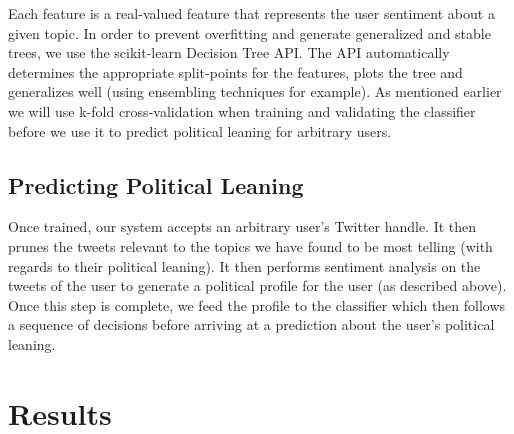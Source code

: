 \documentclass[letterpaper]{article} %
\begin{document}
Each feature is a real-valued feature that represents the user sentiment about a given topic. In order to prevent overfitting and generate generalized and stable trees, we use the scikit-learn Decision Tree API. The API automatically determines the appropriate split-points for the features, plots the tree and generalizes well (using ensembling techniques for example). As mentioned earlier we will use k-fold cross-validation when training and validating the classifier before we use it to predict political leaning for arbitrary users.

\subsection{Predicting Political Leaning}

Once trained, our system accepts an arbitrary user’s Twitter handle. It then prunes the tweets relevant to the topics we have found to be most telling (with regards to their political leaning). It then performs sentiment analysis on the tweets of the user to generate a political profile for the user (as described above). Once this step is complete, we feed the profile to the classifier which then follows a sequence of decisions before arriving at a prediction about the user’s political leaning.


\section{Results}
\end{document}
